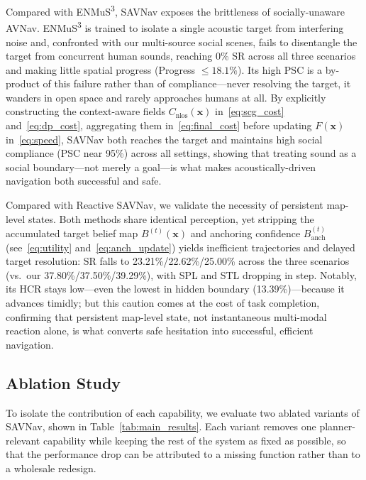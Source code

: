 Compared with ENMuS\textsuperscript{3}, SAVNav exposes the brittleness of socially-unaware AVNav. ENMuS\textsuperscript{3} is trained to isolate a single acoustic target from interfering noise and, confronted with our multi-source social scenes, fails to disentangle the target from concurrent human sounds, reaching 0\% SR across all three scenarios and making little spatial progress (Progress $\leq 18.1\%$). Its high PSC is a by-product of this failure rather than of compliance---never resolving the target, it wanders in open space and rarely approaches humans at all. By explicitly constructing the context-aware fields $C_{\mathrm{nlos}}(\mathbf{x})$ in~\eqref{eq:scg_cost} and~\eqref{eq:dp_cost}, aggregating them in~\eqref{eq:final_cost} before updating $F(\mathbf{x})$ in~\eqref{eq:speed}, SAVNav both reaches the target and maintains high social compliance (PSC near 95\%) across all settings, showing that treating sound as a social boundary---not merely a goal---is what makes acoustically-driven navigation both successful and safe.

Compared with Reactive SAVNav, we validate the necessity of persistent map-level states. Both methods share identical perception, yet stripping the accumulated target belief map $B^{(t)}(\mathbf{x})$ and anchoring confidence $B_{\mathrm{anch}}^{(t)}$ (see~\eqref{eq:utility} and~\eqref{eq:anch_update}) yields inefficient trajectories and delayed target resolution: SR falls to 23.21\%/22.62\%/25.00\% across the three scenarios (vs.\ our 37.80\%/37.50\%/39.29\%), with SPL and STL dropping in step. Notably, its HCR stays low---even the lowest in hidden boundary (13.39\%)---because it advances timidly; but this caution comes at the cost of task completion, confirming that persistent map-level state, not instantaneous multi-modal reaction alone, is what converts safe hesitation into successful, efficient navigation.

\subsection{Ablation Study}
\label{subsec:exp-ablation}

To isolate the contribution of each capability, we evaluate two ablated variants of SAVNav, shown in Table~\ref{tab:main_results}. Each variant removes one planner-relevant capability while keeping the rest of the system as fixed as possible, so that the performance drop can be attributed to a missing function rather than to a wholesale redesign.


